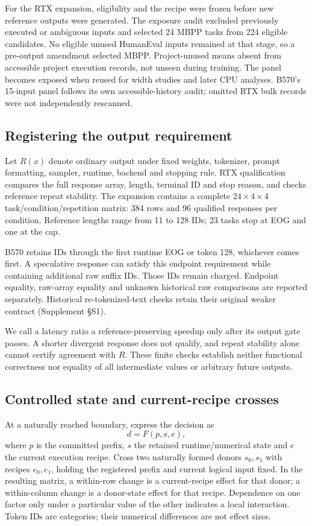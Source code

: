 For the RTX expansion, eligibility and the recipe were frozen before new reference outputs were generated. The exposure audit excluded previously executed or ambiguous inputs and selected 24 MBPP tasks from 224 eligible candidates. No eligible unused HumanEval inputs remained at that stage, so a pre-output amendment selected MBPP. Project-unused means absent from accessible project execution records, not unseen during training. The panel becomes exposed when reused for width studies and later CPU analyses. B570's 15-input panel follows its own accessible-history audit; omitted RTX bulk records were not independently rescanned.

\subsection{Registering the output requirement}
Let $R(x)$ denote ordinary output under fixed weights, tokenizer, prompt formatting, sampler, runtime, backend and stopping rule. RTX qualification compares the full response array, length, terminal ID and stop reason, and checks reference repeat stability. The expansion contains a complete $24\times4\times4$ task/condition/repetition matrix: 384 rows and 96 qualified responses per condition. Reference lengths range from 11 to 128 IDs; 23 tasks stop at EOG and one at the cap.

B570 retains IDs through the first runtime EOG or token 128, whichever comes first. A speculative response can satisfy this endpoint requirement while containing additional raw suffix IDs. Those IDs remain charged. Endpoint equality, raw-array equality and unknown historical raw comparisons are reported separately. Historical re-tokenized-text checks retain their original weaker contract (Supplement \S S1).

We call a latency ratio a reference-preserving speedup only after its output gate passes. A shorter divergent response does not qualify, and repeat stability alone cannot certify agreement with $R$. These finite checks establish neither functional correctness nor equality of all intermediate values or arbitrary future outputs.

\subsection{Controlled state and current-recipe crosses}
At a naturally reached boundary, express the decision as
\begin{equation}
d=F(p,s,e),
\label{eq:decision}
\end{equation}
where $p$ is the committed prefix, $s$ the retained runtime/numerical state and $e$ the current execution recipe. Cross two naturally formed donors $s_0,s_1$ with recipes $e_0,e_1$, holding the registered prefix and current logical input fixed. In the resulting matrix, a within-row change is a current-recipe effect for that donor; a within-column change is a donor-state effect for that recipe. Dependence on one factor only under a particular value of the other indicates a local interaction. Token IDs are categories; their numerical differences are not effect sizes.

